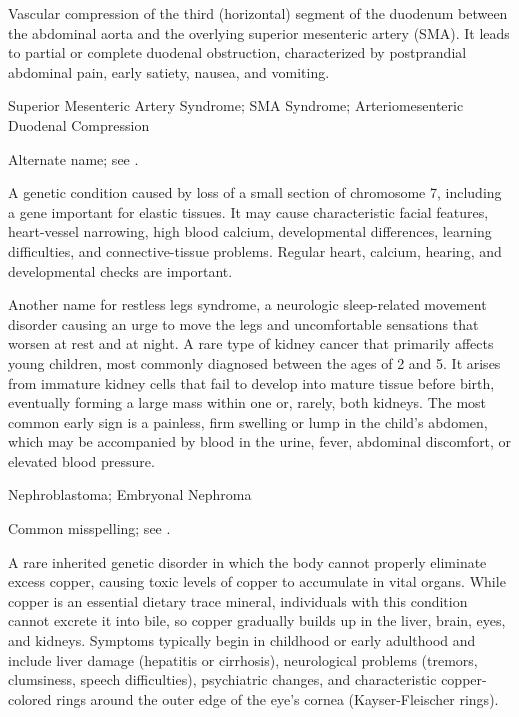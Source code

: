  Vascular compression of the third (horizontal) segment of the duodenum between the abdominal aorta and the overlying superior mesenteric artery (SMA). It leads to partial or complete duodenal obstruction, characterized by postprandial abdominal pain, early satiety, nausea, and vomiting.

\synonyms
Superior Mesenteric Artery Syndrome; SMA Syndrome; Arteriomesenteric Duodenal Compression

 Alternate name; see .

 A genetic condition caused by loss of a small section of chromosome 7, including a gene important for elastic tissues. It may cause characteristic facial features, heart-vessel narrowing, high blood calcium, developmental differences, learning difficulties, and connective-tissue problems. Regular heart, calcium, hearing, and developmental checks are important.

 Another name for restless legs syndrome, a neurologic sleep-related movement disorder causing an urge to move the legs and uncomfortable sensations that worsen at rest and at night.
 A rare type of kidney cancer that primarily affects young children, most commonly diagnosed between the ages of 2 and 5. It arises from immature kidney cells that fail to develop into mature tissue before birth, eventually forming a large mass within one or, rarely, both kidneys. The most common early sign is a painless, firm swelling or lump in the child's abdomen, which may be accompanied by blood in the urine, fever, abdominal discomfort, or elevated blood pressure.

\synonyms
Nephroblastoma; Embryonal Nephroma

 Common misspelling; see .

 A rare inherited genetic disorder in which the body cannot properly eliminate excess copper, causing toxic levels of copper to accumulate in vital organs. While copper is an essential dietary trace mineral, individuals with this condition cannot excrete it into bile, so copper gradually builds up in the liver, brain, eyes, and kidneys. Symptoms typically begin in childhood or early adulthood and include liver damage (hepatitis or cirrhosis), neurological problems (tremors, clumsiness, speech difficulties), psychiatric changes, and characteristic copper-colored rings around the outer edge of the eye's cornea (Kayser-Fleischer rings).

